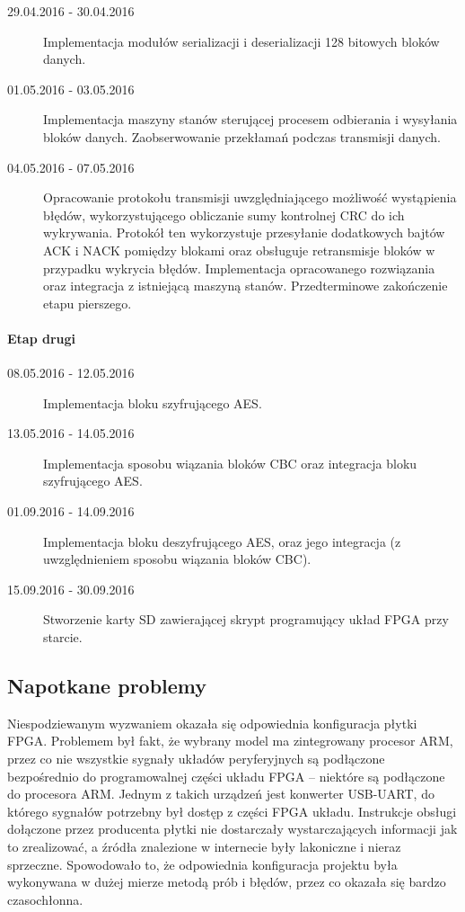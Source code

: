 \begin{description}
\item[29.04.2016 - 30.04.2016] Implementacja modułów serializacji i deserializacji 128 bitowych bloków danych.

\item[01.05.2016 - 03.05.2016] Implementacja maszyny stanów sterującej procesem odbierania i wysyłania bloków danych. Zaobserwowanie przekłamań podczas transmisji danych.

\item[04.05.2016 - 07.05.2016] Opracowanie protokołu transmisji uwzględniającego możliwość wystąpienia błędów, wykorzystującego obliczanie sumy kontrolnej CRC do ich wykrywania. Protokół ten wykorzystuje przesyłanie dodatkowych bajtów ACK i NACK pomiędzy blokami oraz obsługuje retransmisje bloków w przypadku wykrycia błędów. Implementacja opracowanego rozwiązania oraz integracja z istniejącą maszyną stanów. Przedterminowe zakończenie etapu pierszego.

\end{description}
\paragraph{Etap drugi}
\begin{description}
\item[08.05.2016 - 12.05.2016] Implementacja bloku szyfrującego AES.

\item[13.05.2016 - 14.05.2016] Implementacja sposobu wiązania bloków CBC oraz integracja bloku szyfrującego AES.

\item[01.09.2016 - 14.09.2016] Implementacja bloku deszyfrującego AES, oraz jego integracja (z uwzględnieniem sposobu wiązania bloków CBC).

\item[15.09.2016 - 30.09.2016] Stworzenie karty SD zawierającej skrypt programujący układ FPGA przy starcie.
\end{description}


\subsection{Napotkane problemy}
Niespodziewanym wyzwaniem okazała się odpowiednia konfiguracja płytki FPGA. Problemem był fakt, że wybrany model ma zintegrowany procesor ARM, przez co nie wszystkie sygnały układów peryferyjnych są podłączone bezpośrednio do programowalnej części układu FPGA -- niektóre są podłączone do procesora ARM. Jednym z takich urządzeń jest konwerter USB-UART, do którego sygnałów potrzebny był dostęp z części FPGA układu. Instrukcje obsługi dołączone przez producenta płytki nie dostarczały wystarczających informacji jak to zrealizować, a źródła znalezione w internecie były lakoniczne i nieraz sprzeczne. Spowodowało to, że odpowiednia konfiguracja projektu była wykonywana w dużej mierze metodą prób i błędów, przez co okazała się bardzo czasochłonna.

